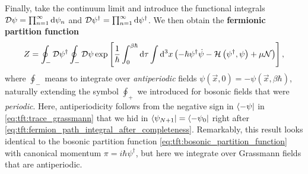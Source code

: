 Finally, take the continuum limit and introduce the functional integrals $\mathcal{D} \psi = \prod_{n=1}^\infty \mathop{}\!\mathrm{d} \psi_n$ and $\mathcal{D} \psi^\dagger = \prod_{n=1}^\infty \mathop{}\!\mathrm{d} \psi^\dagger$. 
We then obtain the \textbf{fermionic partition function}
\begin{equation}
	Z = \oint_- \mathcal{D} \psi^\dagger \oint_- \mathcal{D} \psi \exp \left[ \frac{1}{\hbar} \int_0^{\beta \hbar} \mathop{}\!\mathrm{d} \tau \int \mathop{}\!\mathrm{d}^3 x \left( -\hbar \psi^\dagger \dot{\psi} - \mathcal{H} \left( \psi^\dagger, \psi \right) + \mu \mathcal{N} \right) \right] ,
\label{eq:tft:fermion_partition_function}
\end{equation}
where $\oint_-$ means to integrate over \emph{antiperiodic} fields $\psi(\vec{x}, 0) = -\psi(\vec{x}, \beta \hbar)$, naturally extending the symbol $\oint_+$ we introduced for bosonic fields that were \emph{periodic}.
Here, antiperiodicity follows from the negative sign in $\bra{-\psi}$ in \cref{eq:tft:trace_grassmann} that we hid in $\bra{\psi_{N+1}} = \bra{-\psi_0}$ right after \cref{eq:tft:fermion_path_integral_after_completeness}.
Remarkably, this result looks identical to the bosonic partition function \eqref{eq:tft:bosonic_partition_function} with canonical momentum $\pi = i \hbar \psi^\dagger$, but here we integrate over Grassmann fields that are antiperiodic.

\iffalse
The partition function is therefore
\begin{equation}
\begin{split}
	Z &= \int \dif \psi_0^\dagger \int \dif \psi_0 \, e^{-\psi_{n+1}^\dagger \psi_{n+1}} \braket{-\psi_0 | e^{-\beta(\hat{H} - \mu \hat{N})} | \psi_0} \\
	  &= \prod_n \int \dif \psi_n^\dagger \int \dif \psi_n \, e^{-\psi_{n+1}^\dagger \psi_{n+1}} \braket{\psi_{n+1} | e^{-(\hat{H} - \mu \hat{N}) \Delta \tau / \hbar} | \psi_n} \\
	  &= \prod_n \int \dif \psi_n^\dagger \int \dif \psi_n \, e^{-\psi_{n+1}^\dagger \psi_{n+1}} \braket{\psi_{n+1} | \psi_n} e^{-(H_n - \mu N) \Delta \tau / \hbar} \\
	  &= \prod_n \int \dif \psi_n^\dagger \int \dif \psi_n \, \exp \left\{ -\frac{\Delta t}{\hbar} \sum_n \int \dif^3 x \left( \psi^\dagger_{n+1} \frac{\psi_{n+1} - \psi_n}{\Delta t} + \ham - \mu \numdensity \right) \right\} \\
	  &= \oint_- \pathintdif \psi^\dagger \oint_- \pathintdif \psi \exp \left\{ \frac{1}{\hbar} \int_0^{\beta \hbar} \dif \tau \int \dif^3 x \left( -\psi^\dagger(\vec{x},\tau) \dot{\psi}(\vec{x},\tau) - \ham \left( \psi^\dagger(\vec{x},\tau), \psi(\vec{x},\tau) \right) + \mu \numdensity \right) \right\} \\
\end{split}
\end{equation}
\fi

